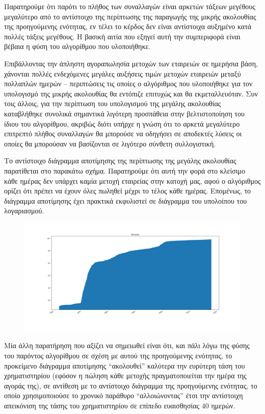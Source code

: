 Παρατηρούμε ότι παρότι το πλήθος των συναλλαγών είναι αρκετών τάξεων μεγέθους μεγαλύτερο από το αντίστοιχο της περίπτωσης της παραγωγής της μικρής ακολουθίας της προηγούμενης ενότητας, εν τέλει το κέρδος δεν είναι αντίστοιχα αυξημένο κατά πολλές τάξεις μεγέθους.
Η βασική αιτία που εξηγεί αυτή την συμπεριφορά είναι βέβαια η φύση του αλγορίθμου που υλοποιήθηκε.

Επιβάλλοντας την άπληστη αγοραπωλησία μετοχών των εταιρειών σε ημερήσια βάση, χάνονται πολλές ενδεχόμενες μεγάλες αυξήσεις τιμών μετοχών εταιρειών μεταξύ πολλαπλών ημερών -- περιπτώσεις τις οποίες ο αλγόριθμος που υλοποιήθηκε για τον υπολογισμό της μικρής ακολουθίας θα εντόπιζε επιτυχώς και θα εκμεταλλευόταν.
Συν τοις άλλοις, για την περίπτωση του υπολογισμού της μεγάλης ακολουθίας καταβλήθηκε συνολικά σημαντικά λιγότερη προσπάθεια στην βελτιστοποίηση του ίδιου του αλγορίθμου, ακριβώς διότι υπήρχε η γνώση ότι το αρκετά μεγαλύτερο επιτρεπτό πλήθος συναλλαγών θα μπορούσε να οδηγήσει σε αποδεκτές λύσεις οι οποίες θα μπορούσαν να βασίζονται σε λιγότερο σύνθετη συλλογιστική.

Το αντίστοιχο διάγραμμα αποτίμησης της περίπτωσης της μεγάλης ακολουθίας παρατίθεται στο παρακάτω σχήμα.
Παρατηρούμε ότι αυτή την φορά στο κλείσιμο κάθε ημέρας δεν υπάρχει καμία μετοχή εταιρείας στην κατοχή μας, αφού ο αλγόριθμος ορίζει ότι πρέπει να έχουν όλες πωληθεί μέχρι το τέλος κάθε ημέρας.
Επομένως, το διάγραμμα αποτίμησης έχει πρακτικά εκφυλιστεί σε διάγραμμα του υπολοίπου του λογαριασμού.

\begin{figure}[H]
\centering
\includegraphics[width=1.1\linewidth]{images/large.png}
\label{fig:valuation_large}
\end{figure}

Μία άλλη παρατήρηση που αξίζει να σημειωθεί είναι ότι, και πάλι λόγω της φύσης του παρόντος αλγορίθμου σε σχέση με αυτού της προηγούμενης ενότητας, το προκείμενο διάγραμμα αποτίμησης ``ακολουθεί'' καλύτερα την ευρύτερη τάση του χρηματιστηρίου (εφόσον η πώληση κάθε μετοχής πραγματοποιείται την ημέρα της αγοράς της), σε αντίθεση με το αντίστοιχο διάγραμμα της προηγούμενης ενότητας, το οποίο χρησιμοποιούσε το χρονικό παράθυρο ``αλλοιώνοντας'' έτσι την αντίστοιχη απεικόνιση της τάσης του χρηματιστηρίου σε επίπεδο ευαισθησίας $40$ ημερών.
